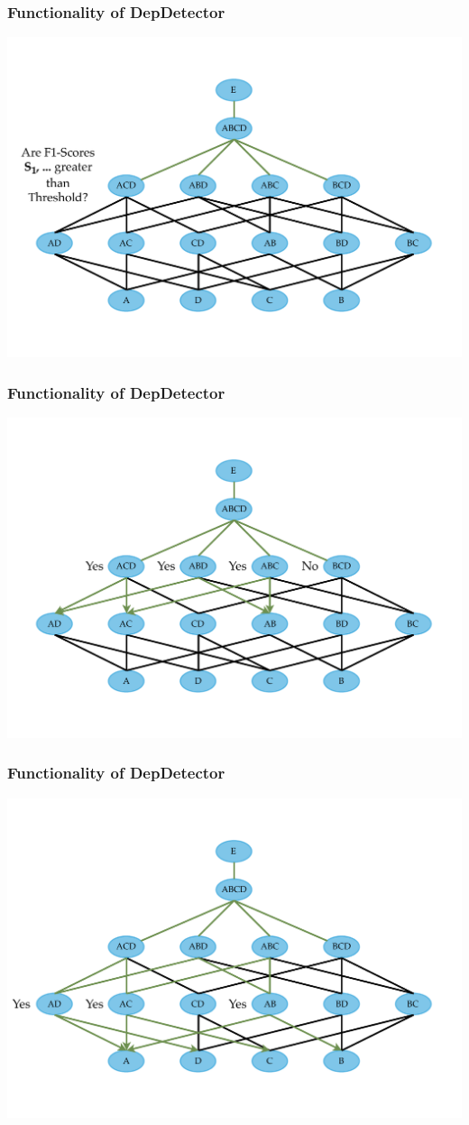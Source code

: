 \documentclass{beamer}
\begin{document}
\begin{frame}
    \frametitle{Functionality of DepDetector}
    \includegraphics[width=.95\textwidth]{min-dep-step-5.pdf}
\end{frame}

\begin{frame}
    \frametitle{Functionality of DepDetector}
    \includegraphics[width=.95\textwidth]{min-dep-step-6.pdf}
\end{frame}

\begin{frame}
    \frametitle{Functionality of DepDetector}
    \includegraphics[width=.95\textwidth]{min-dep-step-7.pdf}
\end{frame}
\end{document}
